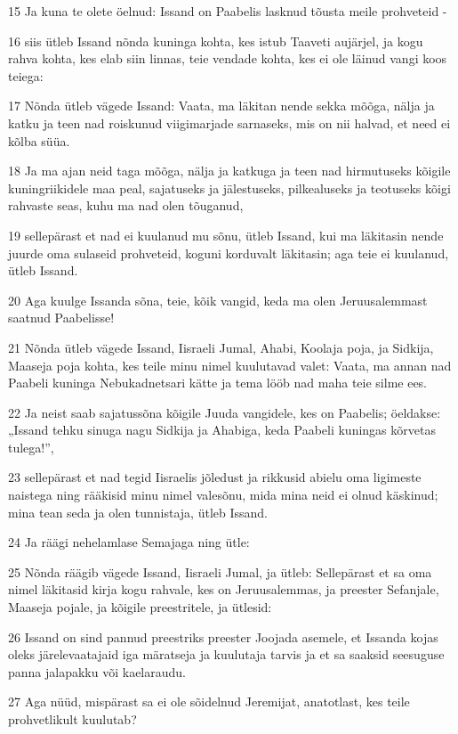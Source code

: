 \par 15 Ja kuna te olete öelnud: Issand on Paabelis lasknud tõusta meile prohveteid -
\par 16 siis ütleb Issand nõnda kuninga kohta, kes istub Taaveti aujärjel, ja kogu rahva kohta, kes elab siin linnas, teie vendade kohta, kes ei ole läinud vangi koos teiega:
\par 17 Nõnda ütleb vägede Issand: Vaata, ma läkitan nende sekka mõõga, nälja ja katku ja teen nad roiskunud viigimarjade sarnaseks, mis on nii halvad, et need ei kõlba süüa.
\par 18 Ja ma ajan neid taga mõõga, nälja ja katkuga ja teen nad hirmutuseks kõigile kuningriikidele maa peal, sajatuseks ja jälestuseks, pilkealuseks ja teotuseks kõigi rahvaste seas, kuhu ma nad olen tõuganud,
\par 19 sellepärast et nad ei kuulanud mu sõnu, ütleb Issand, kui ma läkitasin nende juurde oma sulaseid prohveteid, koguni korduvalt läkitasin; aga teie ei kuulanud, ütleb Issand.
\par 20 Aga kuulge Issanda sõna, teie, kõik vangid, keda ma olen Jeruusalemmast saatnud Paabelisse!
\par 21 Nõnda ütleb vägede Issand, Iisraeli Jumal, Ahabi, Koolaja poja, ja Sidkija, Maaseja poja kohta, kes teile minu nimel kuulutavad valet: Vaata, ma annan nad Paabeli kuninga Nebukadnetsari kätte ja tema lööb nad maha teie silme ees.
\par 22 Ja neist saab sajatussõna kõigile Juuda vangidele, kes on Paabelis; öeldakse: „Issand tehku sinuga nagu Sidkija ja Ahabiga, keda Paabeli kuningas kõrvetas tulega!”,
\par 23 sellepärast et nad tegid Iisraelis jõledust ja rikkusid abielu oma ligimeste naistega ning rääkisid minu nimel valesõnu, mida mina neid ei olnud käskinud; mina tean seda ja olen tunnistaja, ütleb Issand.
\par 24 Ja räägi nehelamlase Semajaga ning ütle:
\par 25 Nõnda räägib vägede Issand, Iisraeli Jumal, ja ütleb: Sellepärast et sa oma nimel läkitasid kirja kogu rahvale, kes on Jeruusalemmas, ja preester Sefanjale, Maaseja pojale, ja kõigile preestritele, ja ütlesid:
\par 26 Issand on sind pannud preestriks preester Joojada asemele, et Issanda kojas oleks järelevaatajaid iga märatseja ja kuulutaja tarvis ja et sa saaksid seesuguse panna jalapakku või kaelaraudu.
\par 27 Aga nüüd, mispärast sa ei ole sõidelnud Jeremijat, anatotlast, kes teile prohvetlikult kuulutab?
